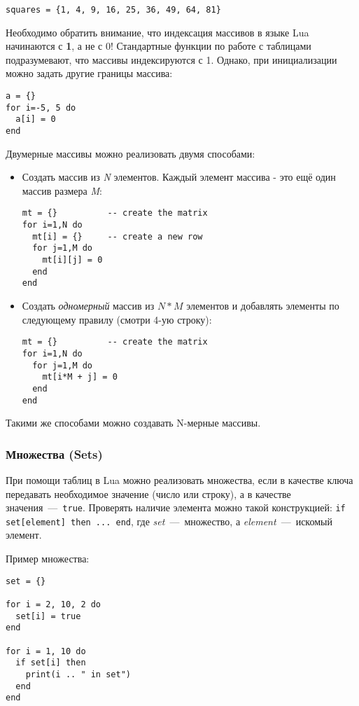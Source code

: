 \begin{lstlisting}
squares = {1, 4, 9, 16, 25, 36, 49, 64, 81}
\end{lstlisting}

Необходимо обратить внимание, что индексация массивов в языке Lua начинаются с \textbf{1}, а не с 0!
Стандартные функции по работе с таблицами подразумевают, что массивы индексируются с 1.
Однако, при инициализации можно задать другие границы массива:

\begin{lstlisting}
a = {}
for i=-5, 5 do
  a[i] = 0
end 
\end{lstlisting}

Двумерные массивы можно реализовать двумя способами:

\begin{itemize}
	\item Создать массив из \emph{N} элементов. Каждый элемент массива - это ещё один массив размера \emph{M}:
	
\begin{lstlisting}
mt = {}          -- create the matrix
for i=1,N do
  mt[i] = {}     -- create a new row
  for j=1,M do
    mt[i][j] = 0
  end
end
\end{lstlisting}

	\item Создать \emph{одномерный} массив из $N * M$ элементов и добавлять элементы по следующему правилу (смотри 4-ую строку):

\begin{lstlisting}
mt = {}          -- create the matrix
for i=1,N do
  for j=1,M do
    mt[i*M + j] = 0
  end
end
\end{lstlisting}
	
\end{itemize}

Такими же способами можно создавать N-мерные массивы.

\subsubsection{Множества (Sets)}

При помощи таблиц в Lua можно реализовать множества, если в качестве ключа передавать необходимое значение (число или строку), 
а в качестве значения~---~\lstinline{true}. Проверять наличие элемента можно такой конструкцией: \lstinline{if set[element] then ... end}, где \emph{set}~---~множество, а \emph{element}~---~искомый элемент.

Пример множества:

\begin{lstlisting}
set = {}

for i = 2, 10, 2 do
  set[i] = true
end

for i = 1, 10 do
  if set[i] then
    print(i .. " in set")  
  end
end
\end{lstlisting}

